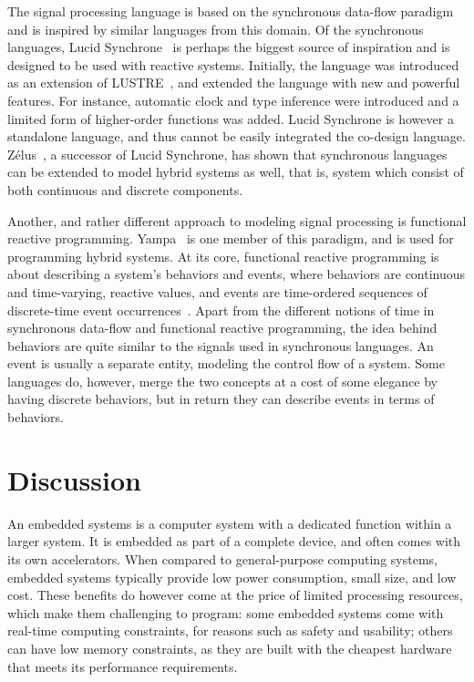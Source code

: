 \documentclass[../paper.tex]{subfiles}
\begin{document}
The signal processing language is based on the synchronous data-flow paradigm and is inspired by similar languages from this domain. Of the synchronous languages, Lucid Synchrone~\cite{pouzet2006, colaco2004} is perhaps the biggest source of inspiration and is designed to be used with reactive systems. Initially, the language was introduced as an extension of LUSTRE~\cite{hu1998}, and extended the language with new and powerful features. For instance, automatic clock and type inference were introduced and a limited form of higher-order functions was added. Lucid Synchrone is however a standalone language, and thus cannot be easily integrated the co-design language. Z{\'e}lus~\cite{zelus2013}, a successor of Lucid Synchrone, has shown that synchronous languages can be extended to model hybrid systems as well, that is, system which consist of both continuous and discrete components.

Another, and rather different approach to modeling signal processing is functional reactive programming. Yampa~\cite{yampa2003} is one member of this paradigm, and is used for programming hybrid systems. At its core, functional reactive programming is about describing a system's behaviors and events, where behaviors are continuous and time-varying, reactive values, and events are time-ordered sequences of discrete-time event occurrences~\cite{nilsson2002}. Apart from the different notions of time in synchronous data-flow and functional reactive programming, the idea behind behaviors are quite similar to the signals used in synchronous languages. An event is usually a separate entity, modeling the control flow of a system. Some languages do, however, merge the two concepts at a cost of some elegance by having discrete behaviors, but in return they can describe events in terms of behaviors.

\section{Discussion}
\label{disc}

An embedded systems is a computer system with a dedicated function within a larger system. It is embedded as part of a complete device, and often comes with its own accelerators. When compared to general-purpose computing systems, embedded systems typically provide low power consumption, small size, and low cost. These benefits do however come at the price of limited processing resources, which make them challenging to program: some embedded systems come with real-time computing constraints, for reasons such as safety and usability; others can have low memory constraints, as they are built with the cheapest hardware that meets its performance requirements.
\end{document}

